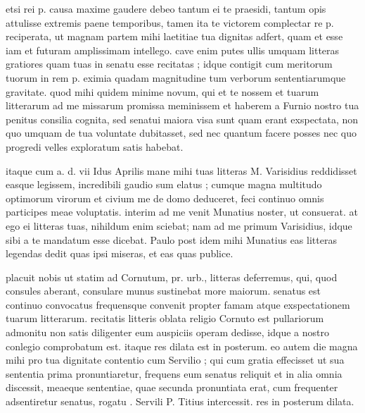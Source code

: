 


 etsi rei p. causa maxime gaudere debeo tantum ei te praesidi, tantum opis attulisse extremis paene temporibus, tamen ita te victorem complectar re p. reciperata, ut magnam partem mihi laetitiae tua dignitas adfert, quam et esse iam et futuram amplissimam intellego. cave enim putes ullis umquam litteras gratiores quam tuas in senatu esse recitatas ; idque contigit cum meritorum tuorum in rem p. eximia quadam magnitudine tum verborum sententiarumque gravitate. quod mihi quidem minime novum, qui et te nossem et tuarum litterarum ad me missarum promissa meminissem et haberem a Furnio nostro tua penitus consilia cognita, sed senatui maiora visa sunt quam erant exspectata, non quo umquam de tua voluntate dubitasset, sed nec quantum facere posses nec quo progredi velles exploratum satis habebat.

 itaque cum a. d. vii Idus Aprilis mane mihi tuas litteras M. Varisidius reddidisset easque legissem, incredibili gaudio sum elatus ; cumque magna multitudo optimorum virorum et civium me de domo deduceret, feci continuo omnis participes meae voluptatis. interim ad me venit Munatius noster, ut consuerat. at ego ei litteras tuas, nihildum enim sciebat; nam ad me primum Varisidius, idque sibi a te mandatum esse dicebat. Paulo post idem mihi Munatius eas litteras legendas dedit quas ipsi miseras, et eas quas publice.

 placuit nobis ut statim ad Cornutum, pr. urb., litteras deferremus, qui, quod consules aberant, consulare munus sustinebat more maiorum. senatus est continuo convocatus frequensque convenit propter famam atque exspectationem tuarum litterarum. recitatis litteris oblata religio Cornuto est pullariorum admonitu non satis diligenter eum auspiciis operam dedisse, idque a nostro conlegio comprobatum est. itaque res dilata est in posterum. eo autem die magna mihi pro tua dignitate contentio cum Servilio ; qui cum gratia effecisset ut sua sententia prima pronuntiaretur, frequens eum senatus reliquit et in alia omnia discessit, meaeque sententiae, quae secunda pronuntiata erat, cum frequenter adsentiretur senatus, rogatu . Servili P. Titius intercessit. res in posterum dilata.

